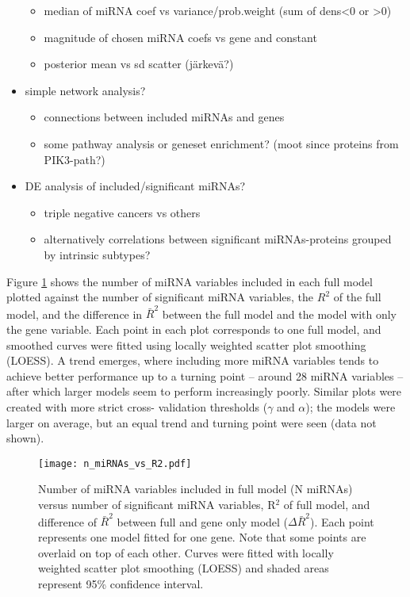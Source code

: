 \begin{itemize}
\begin{itemize}
    \item median of miRNA coef vs variance/prob.weight (sum of dens<0 or >0)
    \item magnitude of chosen miRNA coefs vs gene and constant
    \item posterior mean vs sd scatter (järkevä?)
  \end{itemize}
  \item simple network analysis?
  \begin{itemize}
    \item connections between included miRNAs and genes
    \item some pathway analysis or geneset enrichment? (moot since proteins from PIK3-path?)
  \end{itemize}
  \item DE analysis of included/significant miRNAs?
  \begin{itemize}
    \item triple negative cancers vs others
    \item alternatively correlations between significant miRNAs-proteins grouped by intrinsic subtypes?
  \end{itemize}

\end{itemize}

    

Figure \ref{n-miRNAs-vs-R2} shows the number of miRNA variables included in
each full model plotted against the number of significant miRNA variables, the
$R^2$ of the full model, and the difference in $\bar{R}^2$ between the full
model and the model with only the gene variable. Each point in each plot
corresponds to one full model, and smoothed curves were fitted using locally
weighted scatter plot smoothing (LOESS). A trend emerges, where including more
miRNA variables tends to achieve better performance up to a turning point --
around 28 miRNA variables -- after which larger models seem to perform
increasingly poorly. Similar plots were created with more strict cross-
validation thresholds ($\gamma$ and $\alpha$); the models were larger on
average, but an equal trend and turning point were seen (data not shown).

\begin{figure}[htb]
\centering \texttt{[image: n\_miRNAs\_vs\_R2.pdf]}
\caption{Number of miRNA variables included in full model (N miRNAs) versus number of significant miRNA variables, R$^2$ of full model, and difference of $\bar{R}^2$ between full and gene only model ($\Delta\bar{R}^2$). Each point represents one model fitted for one gene. Note that some points are overlaid on top of each other. Curves were fitted with locally
weighted scatter plot smoothing (LOESS) and shaded areas represent 95\% confidence interval. \label{n-miRNAs-vs-R2}}
\end{figure}

